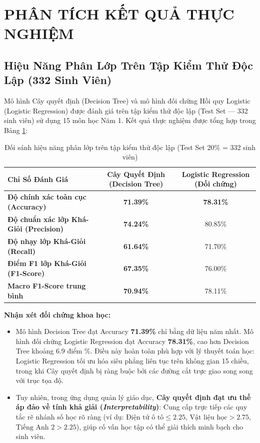 \documentclass[12pt,a4paper]{article}
\begin{document}
\section{PHÂN TÍCH KẾT QUẢ THỰC NGHIỆM}

\subsection{Hiệu Năng Phân Lớp Trên Tập Kiểm Thử Độc Lập (332 Sinh Viên)}
Mô hình Cây quyết định (Decision Tree) và mô hình đối chứng Hồi quy Logistic (Logistic Regression) được đánh giá trên tập kiểm thử độc lập (Test Set --- 332 sinh viên) sử dụng 15 môn học Năm 1. Kết quả thực nghiệm được tổng hợp trong Bảng \ref{tab:model_comparison}:

\begin{table}[H]
\centering
\begin{tabularx}{0.85\textwidth}{|X|c|c|}
\hline
\rowcolor{primaryblue}
\textbf{\color{white}Chỉ Số Đánh Giá} & \textbf{\color{white}Cây Quyết Định (Decision Tree)} & \textbf{\color{white}Logistic Regression (Đối chứng)} \\
\hline
\textbf{Độ chính xác toàn cục (Accuracy)} & \textbf{71.39\%} & \textbf{78.31\%} \\
\hline
\textbf{Độ chuẩn xác lớp Khá-Giỏi (Precision)} & \textbf{74.24\%} & 80.85\% \\
\hline
\textbf{Độ nhạy lớp Khá-Giỏi (Recall)} & \textbf{61.64\%} & 71.70\% \\
\hline
\textbf{Điểm F1 lớp Khá-Giỏi (F1-Score)} & \textbf{67.35\%} & 76.00\% \\
\hline
\textbf{Macro F1-Score trung bình} & \textbf{70.94\%} & 78.11\% \\
\hline
\end{tabularx}
\caption{Đối sánh hiệu năng phân lớp trên tập kiểm thử độc lập (Test Set 20\% = 332 sinh viên)}
\label{tab:model_comparison}
\end{table}

\noindent\textbf{Nhận xét đối chứng khoa học:}
\begin{itemize}
    \item Mô hình Decision Tree đạt Accuracy \textbf{71.39\%} chỉ bằng dữ liệu năm nhất. Mô hình đối chứng Logistic Regression đạt Accuracy \textbf{78.31\%}, cao hơn Decision Tree khoảng 6.9 điểm \%. Điều này hoàn toàn phù hợp với lý thuyết toán học: Logistic Regression tối ưu hóa siêu phẳng liên tục trên không gian 15 chiều, trong khi Cây quyết định bị ràng buộc bởi các đường cắt trực giao song song với trục tọa độ.
    \item Tuy nhiên, trong ứng dụng quản lý giáo dục, \textbf{Cây quyết định đạt ưu thế áp đảo về tính khả giải (\textit{Interpretability})}: Cung cấp trực tiếp các quy tắc rẽ nhánh số học rõ ràng (ví dụ: $\text{Điện tử ô tô} \le 2.25$, $\text{Vật liệu học} > 2.75$, $\text{Tiếng Anh 2} > 2.25$), giúp cố vấn học tập có thể giải thích minh bạch cho sinh viên.
\end{itemize}
\end{document}
